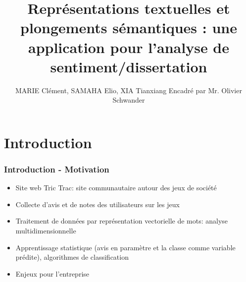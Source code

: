 \documentclass{beamer}
\title{Représentations textuelles et plongements sémantiques : une application pour l'analyse de sentiment/dissertation}
\author{MARIE Clément, SAMAHA Elio, XIA Tianxiang \newline \newline Encadré par Mr. Olivier Schwander}
\begin{document}
\frame{\titlepage}

\begin{frame}
    \tableofcontents
\end{frame}
\section{Introduction}
\begin{frame}
\frametitle{Introduction - Motivation}


\vspace{2cm}

\begin{itemize}
  \item Site web Tric Trac: site communautaire autour des jeux de société
  \item Collecte d'avis et de notes des utilisateurs sur les jeux
  \item Traitement de données par représentation vectorielle de mots: analyse multidimensionnelle
  \item Apprentissage statistique (avis en paramètre et la classe comme variable prédite), algorithmes de classification
  \item Enjeux pour l'entreprise   
\end{itemize}
\end{frame}
\end{document}
